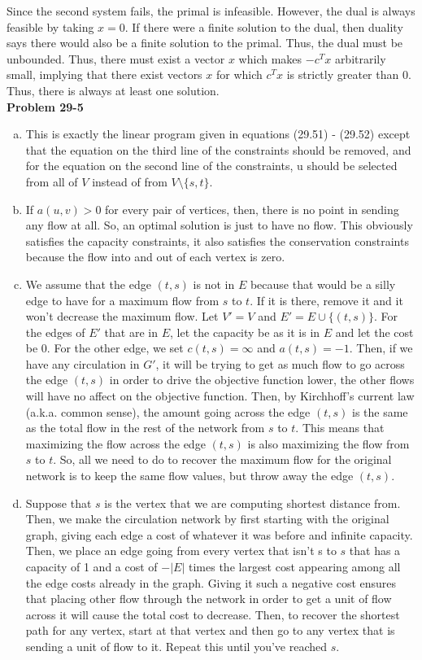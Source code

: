 \documentclass{article}
\begin{document}
Since the second system fails, the primal is infeasible.  However, the dual is always feasible by taking $x=0$.  If there were a finite solution to the dual, then duality says there would also be a finite solution to the primal.  Thus, the dual must be unbounded. Thus, there must exist a vector $x$ which makes $-c^Tx$ arbitrarily small, implying that there exist vectors $x$ for which $c^Tx$ is strictly greater than 0.  Thus, there is always at least one solution. \\


\noindent\textbf{Problem 29-5}\\

\begin{enumerate}[a.]
\item
This is exactly the linear program given in equations (29.51) - (29.52) except that the equation on the third line of the constraints should be removed, and for the equation on the second line of the constraints, u should be selected from all of $V$ instead of from $V \setminus \{s,t\}$.
\item
If $a(u,v) > 0$ for every pair of vertices, then, there is no point in sending any flow at all. So, an optimal solution is just to have no flow. This obviously satisfies the capacity constraints, it also satisfies the conservation constraints because the flow into and out of each vertex is zero.
\item
We assume that the edge $(t,s)$ is not in $E$ because that would be a silly edge to have for a maximum flow from $s$ to $t$. If it is there, remove it and it won't decrease the maximum flow. Let $V' = V$ and $E' = E \cup \{(t,s)\}$. For the edges of $E'$ that are in $E$, let the capacity be as it is in $E$ and let the cost be 0. For the other edge, we set $c(t,s) = \infty$ and $a(t,s) = -1$. Then, if we have any circulation in $G'$, it will be trying to get as much flow to go across the edge $(t,s)$ in order to drive the objective function lower, the other flows will have no affect on the objective function. Then, by Kirchhoff's current law (a.k.a. common sense), the amount going across the edge $(t,s)$ is the same as the total flow in the rest of the network from $s$ to $t$. This means that maximizing the flow across the edge $(t,s)$ is also maximizing the flow from $s$ to $t$. So, all we need to do to recover the maximum flow for the original network is to keep the same flow values, but throw away the edge $(t,s)$.
\item
Suppose that $s$ is the vertex that we are computing shortest distance from. Then, we make the circulation network by first starting with the original graph, giving each edge a cost of whatever it was before and infinite capacity. Then, we place an edge going from every vertex that isn't s to $s$ that has a capacity of 1 and a cost of $-|E|$ times the largest cost appearing among all the edge costs already in the graph. Giving it such a negative cost ensures that placing other flow through the network in order to get a unit of flow across it will cause the total cost to decrease. Then, to recover the shortest path for any vertex, start at that vertex and then go to any vertex that is sending a unit of flow to it. Repeat this until you've reached $s$.
\end{enumerate}
\end{document}
